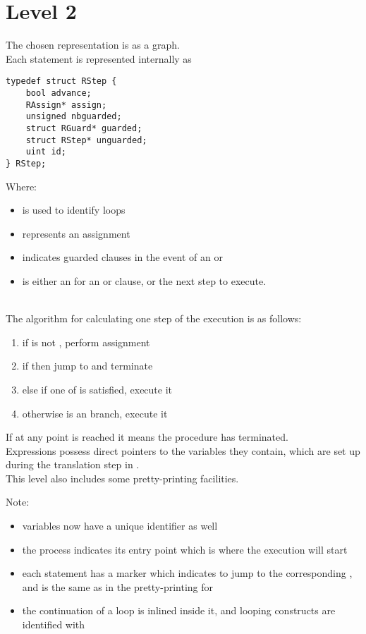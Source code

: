 \section{Level 2}

The chosen representation is as a graph.\\

Each statement is represented internally as
\begin{lstlisting}
typedef struct RStep {
    bool advance;
    RAssign* assign;
    unsigned nbguarded;
    struct RGuard* guarded;
    struct RStep* unguarded;
    uint id;
} RStep;
\end{lstlisting}
Where:
\begin{itemize}
    \item {} is used to identify loops
    \item {} represents an assignment
    \item {} indicates guarded clauses in the event of an
         or 
    \item {} is either an  for an  or 
        clause, or the next step to execute.
\end{itemize}~\\

The algorithm for calculating one step of the execution is as follows:
\begin{enumerate}
    \item if  is not , perform assignment
    \item if  then jump to  and terminate
    \item else if one of  is satisfied, execute it
    \item otherwise  is an  branch, execute it
\end{enumerate}
If at any point  is reached it means the procedure has terminated.\\

Expressions possess direct pointers to the variables they contain, which are
set up during the translation step in .\\

This level also includes some pretty-printing facilities.



Note:
\begin{itemize}
    \item variables now have a unique identifier as well
    \item the process indicates its entry point which is where the
        execution will start
    \item each statement has a \ttt{[n]} marker which indicates
        to jump to the corresponding , and  is the same
        as in the pretty-printing for 
    \item the continuation of a loop is inlined inside it, and looping
        constructs are identified with 
\end{itemize}~\\


